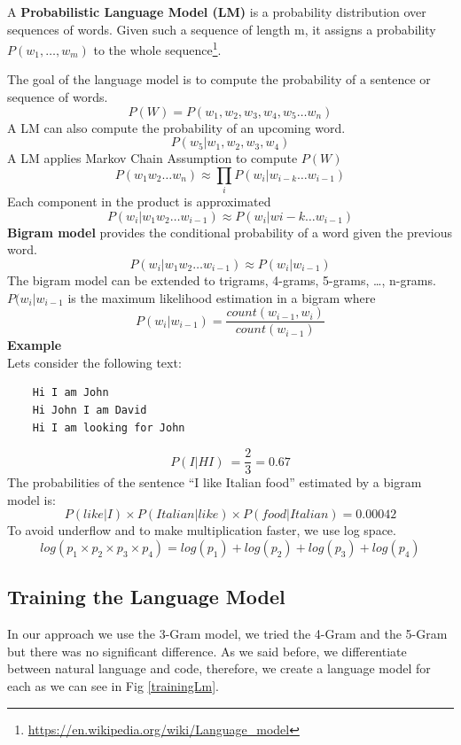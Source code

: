 \documentclass[12pt,mscthesis]{usiinfthesis}
\begin{document}
	A \textbf{Probabilistic Language Model (LM)} is a probability distribution over sequences of words. Given such a sequence of length m, it assigns a probability $P(w_{1},\ldots ,w_{m})$ to the whole sequence\footnote{\url{https://en.wikipedia.org/wiki/Language_model}}.


	The goal of the language model is to compute the probability of a sentence or sequence of words.
	\[P(W) = P(w_{1},w_2,w_3,w_4,w_5\dots w_n)\]
	A LM can also compute the probability of an upcoming word.
	\[P(w_5|w_1,w_2,w_3,w_4)\]
	A LM applies Markov Chain Assumption to compute $P(W)$
	\[P(w_1w_2\dots w_n) \approx \prod_{i} P(w_i|w_{i-k} \dots w_{i-1})\]
	Each component in the product is approximated
	\[P(w_i |w_1w_2\dots w_{i-1}) \approx P(w_i |w{i-k} \dots w_{i-1})\]
	\textbf{Bigram model} provides the conditional probability of a word given the previous word.
	\[P(w_i |w_1w_2 \dots w_{i-1})\approx P(w_i |w_{i-1})\]
	The bigram model can be extended to trigrams, 4-grams, 5-grams, \dots , n-grams.\\
	$P(w_i |w_{i-1}$ is the maximum likelihood estimation in a bigram where 
	\[P(w_{i}|w_{{i-1}})=\frac{count(w_{{i-1}},w_{i})} {count(w_{{i-1}})}\]
	\textbf{Example}\\
	Lets consider the following text:
	\begin{verbatim}
	Hi I am John
	Hi John I am David
	Hi I am looking for John
\end{verbatim}
	\[P(I|HI)\ = \frac{2}{3} = 0.67\]
	The probabilities of the sentence ``I like Italian food'' estimated by a bigram model is:
	\[P(like|I) \times P(Italian|like) \times P(food|Italian)= 0.00042\]
	To avoid underflow and to make multiplication faster, we use log space.
	\[log( p_1 \times p_2 \times p_3 \times p_4 ) = log (p_1) + log (p_2) + log (p_3) + log (p_4)\]



	\subsection{Training the Language Model}
	In our approach we use the 3-Gram model, we tried the 4-Gram and the 5-Gram but there was no significant difference. As we said before, we differentiate between natural language and code, therefore, we create a language model for each as we can see in Fig \ref{trainingLm}.\\
\end{document}
